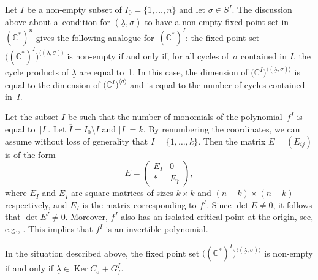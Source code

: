 Let $I$ be a non-empty subset of $I_0=\{1, \dots , n\}$ and let $\sigma \in S^I$. The discussion above about
a~condition for $(\underline{\lambda}, \sigma)$ to have a non-empty fixed point set in $({\mathbb C}^*)^n$ gives the following analogue for~$({\mathbb C}^*)^I$: the fixed point set $\big(({\mathbb C}^*)^I\big)^{\langle (\underline{\lambda}, \sigma) \rangle}$ is non-empty if and only if, for all cycles of~$\sigma$ contained in $I$, the cycle products of $\underline{\lambda}$
are equal to~1. In this case, the dimension of $\big({\mathbb C}^I\big)^{\langle (\underline{\lambda},\sigma) \rangle}$ is equal to the dimension of $\big({\mathbb C}^I\big)^{\langle \sigma \rangle}$ and is equal to the number of cycles contained in~$I$.

Let the subset $I$ be such that the number of monomials of the polynomial~$f^I$ is equal to~$|I|$.
Let $\overline{I}=I_0 \setminus I$ and $|I|=k$. By renumbering the coordinates, we can assume without loss of generality that $I=\{1, \dots , k\}$. Then the matrix $E=(E_{ij})$ is of the form
\[
E = \left( \begin{matrix} E_I & 0 \\ \ast & E_{\overline{I}} \end{matrix} \right),
\]
where $E_I$ and $E_{\overline{I}}$ are square matrices of sizes $k \times k$ and $(n-k) \times (n-k)$ respectively, and $E_I$ is the matrix corresponding to $f^I$. Since $\det E \neq 0$, it follows that $\det E^I \neq 0$. Moreover, $f^I$ also has an isolated critical point at the origin, see, e.g., \cite[Proposition~5]{ET}. This implies that $f^I$ is an invertible polynomial.

\begin{Proposition} \label{prop:fixed_point} In the situation described above, the fixed point set $\big(({\mathbb C}^*)^I\big)^{\langle (\underline{\lambda}, \sigma) \rangle}$
is non-empty if and only if $\underline{\lambda} \in \operatorname{Ker} C_\sigma + G_f^I$.
\end{Proposition}

